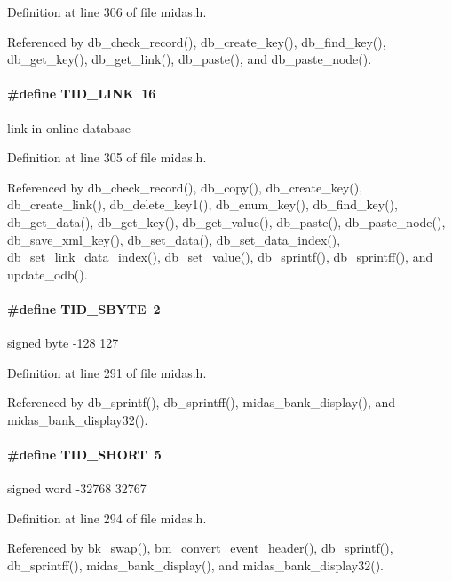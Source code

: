 Definition at line 306 of file midas.h.

Referenced by db\_\-check\_\-record(), db\_\-create\_\-key(), db\_\-find\_\-key(), db\_\-get\_\-key(), db\_\-get\_\-link(), db\_\-paste(), and db\_\-paste\_\-node().
\paragraph[{TID\_\-LINK}]{\setlength{\rightskip}{0pt plus 5cm}\#define TID\_\-LINK~16}\hfill\label{group__mdefineh_gaa63f41f547c7f46f828aaf35073807ea}
link in online database 

Definition at line 305 of file midas.h.

Referenced by db\_\-check\_\-record(), db\_\-copy(), db\_\-create\_\-key(), db\_\-create\_\-link(), db\_\-delete\_\-key1(), db\_\-enum\_\-key(), db\_\-find\_\-key(), db\_\-get\_\-data(), db\_\-get\_\-key(), db\_\-get\_\-value(), db\_\-paste(), db\_\-paste\_\-node(), db\_\-save\_\-xml\_\-key(), db\_\-set\_\-data(), db\_\-set\_\-data\_\-index(), db\_\-set\_\-link\_\-data\_\-index(), db\_\-set\_\-value(), db\_\-sprintf(), db\_\-sprintff(), and update\_\-odb().
\paragraph[{TID\_\-SBYTE}]{\setlength{\rightskip}{0pt plus 5cm}\#define TID\_\-SBYTE~2}\hfill\label{group__mdefineh_ga150e3437f490b1e7c0e11046a9ead174}
signed byte -\/128 127 

Definition at line 291 of file midas.h.

Referenced by db\_\-sprintf(), db\_\-sprintff(), midas\_\-bank\_\-display(), and midas\_\-bank\_\-display32().
\paragraph[{TID\_\-SHORT}]{\setlength{\rightskip}{0pt plus 5cm}\#define TID\_\-SHORT~5}\hfill\label{group__mdefineh_ga4281dafac4285eae3e3c9be0a1d93c5a}
signed word -\/32768 32767 

Definition at line 294 of file midas.h.

Referenced by bk\_\-swap(), bm\_\-convert\_\-event\_\-header(), db\_\-sprintf(), db\_\-sprintff(), midas\_\-bank\_\-display(), and midas\_\-bank\_\-display32().
